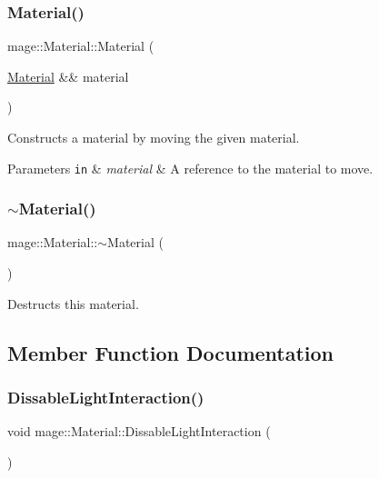 \subsubsection{\texorpdfstring{Material()}{Material()}\hspace{0.1cm}{\footnotesize\ttfamily [3/3]}}
{\footnotesize\ttfamily mage\+::\+Material\+::\+Material (\begin{DoxyParamCaption}\item[{\hyperlink{classmage_1_1_material}{Material} \&\&}]{material }\end{DoxyParamCaption})\hspace{0.3cm}{\ttfamily [default]}}

Constructs a material by moving the given material.


\begin{DoxyParams}[1]{Parameters}
\mbox{\tt in}  & {\em material} & A reference to the material to move. \\
\hline
\end{DoxyParams}
\hypertarget{classmage_1_1_material_a4ca65b7e24144ee08dd1ce8d0eda9284}{}\label{classmage_1_1_material_a4ca65b7e24144ee08dd1ce8d0eda9284} 
\subsubsection{\texorpdfstring{$\sim$\+Material()}{~Material()}}
{\footnotesize\ttfamily mage\+::\+Material\+::$\sim$\+Material (\begin{DoxyParamCaption}{ }\end{DoxyParamCaption})\hspace{0.3cm}{\ttfamily [default]}}

Destructs this material. 

\subsection{Member Function Documentation}
\hypertarget{classmage_1_1_material_ab4b92a53ee74e401c518eea299fb4e0b}{}\label{classmage_1_1_material_ab4b92a53ee74e401c518eea299fb4e0b} 
\subsubsection{\texorpdfstring{Dissable\+Light\+Interaction()}{DissableLightInteraction()}}
{\footnotesize\ttfamily void mage\+::\+Material\+::\+Dissable\+Light\+Interaction (\begin{DoxyParamCaption}{ }\end{DoxyParamCaption})\hspace{0.3cm}{\ttfamily [noexcept]}}

